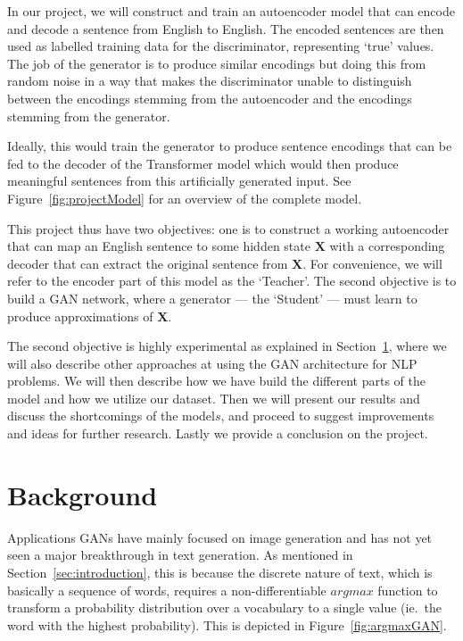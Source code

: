 \documentclass{article}
\begin{document}
In our project, we will construct and train an autoencoder model that can encode
and decode a sentence from English to English. The encoded sentences are then
used as labelled training data for the discriminator, representing `true'
values. The job of the generator is to produce similar encodings but doing this
from random noise in a way that makes the discriminator unable to distinguish
between the encodings stemming from the autoencoder and the encodings stemming
from the generator.

Ideally, this would train the generator to produce sentence encodings that can
be fed to the decoder of the Transformer model which would then produce
meaningful sentences from this artificially generated input. See
Figure~\ref{fig:projectModel} for an overview of the complete model.

This project thus have two objectives: one is to construct a working autoencoder
that can map an English sentence to some hidden state $\mathbf{X}$ with a
corresponding decoder that can extract the original sentence from $\mathbf{X}$.
For convenience, we will refer to the encoder part of this model as the
`Teacher'. The second objective is to build a GAN network, where a generator ---
the `Student' --- must learn to produce approximations of $\mathbf{X}$.

The second objective is highly experimental as explained in
Section~\ref{sec:background}, where we will also describe other approaches at
using the GAN architecture for NLP problems.
We will then describe how we have build the different parts of the model and how we utilize
our dataset.
Then we will present our results and
discuss the shortcomings of the model\(s\), and proceed to suggest improvements and
ideas for further research.
Lastly we provide a conclusion on the project.


\section{Background}\label{sec:background}

Applications GANs have mainly focused on image generation and has not yet seen a
major breakthrough in text generation. As mentioned in
Section~\ref{sec:introduction}, this is because the discrete nature of text,
which is basically a sequence of words, requires a non-differentiable $argmax$
function to transform a probability distribution over a vocabulary to a single
value (ie.\ the word with the highest probability). This is depicted in
Figure~\ref{fig:argmaxGAN}.
\end{document}
